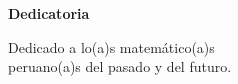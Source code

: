 
\begin{dedication}
    \normalsize\textbf{Dedicatoria}

    Dedicado a lo(a)s matemático(a)s \\
    peruano(a)s del pasado y del futuro.
\end{dedication}